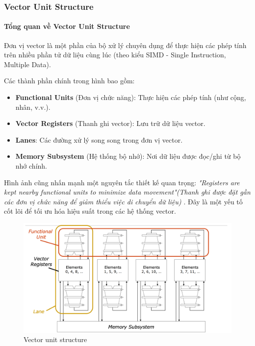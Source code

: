 \documentclass[a4paper]{article}
\begin{document}
\subsubsection{Vector Unit Structure}
\paragraph{Tổng quan về Vector Unit Structure}

Đơn vị vector là một phần của bộ xử lý chuyên dụng để thực hiện các phép tính trên nhiều phần tử dữ liệu cùng lúc (theo kiểu SIMD - Single Instruction, Multiple Data).

Các thành phần chính trong hình bao gồm:
\begin{itemize}
    \item \textbf{Functional Units} (Đơn vị chức năng): Thực hiện các phép tính (như cộng, nhân, v.v.).
    \item \textbf{Vector Registers} (Thanh ghi vector): Lưu trữ dữ liệu vector.
    \item \textbf{Lanes}: Các đường xử lý song song trong đơn vị vector.
    \item \textbf{Memory Subsystem} (Hệ thống bộ nhớ): Nơi dữ liệu được đọc/ghi từ bộ nhớ chính.
\end{itemize}

Hình ảnh cũng nhấn mạnh một nguyên tắc thiết kế quan trọng: \textit{"Registers are kept nearby functional units to minimize data movement"(Thanh ghi được đặt gần các đơn vị chức năng để giảm thiểu việc di chuyển dữ liệu)} . Đây là một yếu tố cốt lõi để tối ưu hóa hiệu suất trong các hệ thống vector.

\begin{figure}[H]
    \centering
    \includegraphics[width=1\linewidth]{assets/vector-unit.png}
    \caption{Vector unit structure}
    \label{fig:enter-label}
\end{figure}
\end{document}
